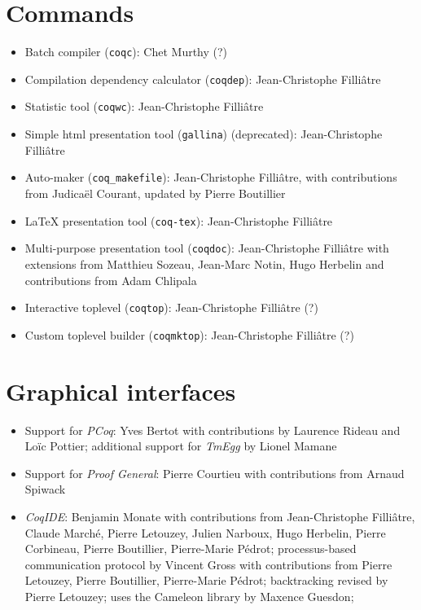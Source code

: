 \documentclass{article}
\begin{document}
\section{Commands}

\begin{itemize}
\item Batch compiler (\texttt{coqc}):  Chet Murthy (?)
\item Compilation dependency calculator (\texttt{coqdep}):
  Jean-Christophe Filliâtre
\item Statistic tool (\texttt{coqwc}): Jean-Christophe Filliâtre
\item Simple html presentation tool (\texttt{gallina}) (deprecated): Jean-Christophe Filliâtre
\item Auto-maker (\texttt{coq\_makefile}): Jean-Christophe Filliâtre,
  with contributions from Judicaël Courant, updated by Pierre Boutillier
\item LaTeX presentation tool (\texttt{coq-tex}): Jean-Christophe Filliâtre
\item Multi-purpose presentation tool (\texttt{coqdoc}): Jean-Christophe Filliâtre with extensions from
  Matthieu Sozeau, Jean-Marc Notin, Hugo Herbelin and contributions from Adam Chlipala
\item Interactive toplevel (\texttt{coqtop}): Jean-Christophe Filliâtre (?)
\item Custom toplevel builder (\texttt{coqmktop}): Jean-Christophe Filliâtre (?)
\end{itemize}

\section{Graphical interfaces}

\begin{itemize}
\item Support for {\em PCoq}: Yves Bertot with contributions by
  Laurence Rideau and Loïc Pottier; additional support for {\em TmEgg}
  by Lionel Mamane
\item Support for {\em Proof General}: Pierre Courtieu with contributions from Arnaud Spiwack
\item {\em CoqIDE}: Benjamin Monate with contributions from
  Jean-Christophe Filliâtre, Claude Marché, Pierre Letouzey, Julien
  Narboux, Hugo Herbelin, Pierre Corbineau, Pierre Boutillier,
  Pierre-Marie Pédrot; processus-based communication protocol by
  Vincent Gross with contributions from Pierre Letouzey, Pierre
  Boutillier, Pierre-Marie Pédrot; backtracking revised by Pierre
  Letouzey; uses the Cameleon library by Maxence Guesdon;
\end{itemize}
\end{document}
